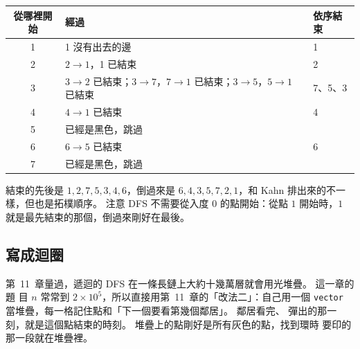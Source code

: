 \begin{center}
\begin{tabular}{cll}
\toprule
從哪裡開始 & 經過 & 依序結束 \\
\midrule
1 & 1 沒有出去的邊 & 1 \\
2 & $2 \to 1$，1 已結束 & 2 \\
3 & $3 \to 2$ 已結束；$3 \to 7$，$7 \to 1$ 已結束；$3 \to 5$，$5 \to 1$ 已結束
& 7、5、3 \\
4 & $4 \to 1$ 已結束 & 4 \\
5 & 已經是黑色，跳過 & \\
6 & $6 \to 5$ 已結束 & 6 \\
7 & 已經是黑色，跳過 & \\
\bottomrule
\end{tabular}
\end{center}

結束的先後是 $1, 2, 7, 5, 3, 4, 6$，倒過來是 $6, 4, 3, 5, 7, 2, 1$，和 Kahn
排出來的不一樣，但也是拓樸順序。 注意 DFS 不需要從入度 $0$ 的點開始：從點 $1$
開始時，$1$ 就是最先結束的那個，倒過來剛好在最後。

\subsection{寫成迴圈}

第~11~章量過，遞迴的 DFS 在一條長鏈上大約十幾萬層就會用光堆疊。 這一章的題
目 $n$ 常常到 $2 \times 10^5$，所以直接用第~11~章的「改法二」：自己用一個
\texttt{vector} 當堆疊，每一格記住點和「下一個要看第幾個鄰居」。 鄰居看完、
彈出的那一刻，就是這個點結束的時刻。 堆疊上的點剛好是所有灰色的點，找到環時
要印的那一段就在堆疊裡。

